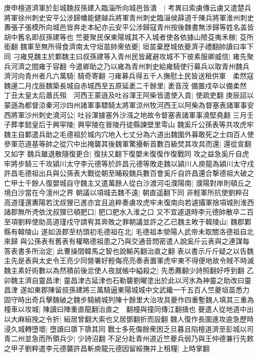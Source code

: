 庚申檀道濟軍於彭城魏叔孫建入臨淄所向城邑皆潰　|{
	考異曰索虜傳云虜又遣楚兵將軍徐州刺史安平公涉歸幡能健越兵將軍青州刺史臨淄侯薛道千陳兵將軍淮州刺史夀張子張模所向城邑皆奔走本紀亦云安平公涉歸寇青州按後魏書無涉歸等姓名盖皆胡中舊名即叔孫建等也}
竺夔聚民保東陽城其不入城者使各依據山險芟夷禾稼|{
	芟所銜翻}
魏軍至無所得食濟南太守垣苗帥衆依夔|{
	垣苗棄歷城依夔濟子禮翻帥讀曰率下同}
刁雍見魏主於鄴魏主曰叔孫建等入青州民皆藏避攻城不下彼素服卿威信|{
	雍先聚兵河濟之間雍于容翻}
今遣卿助之乃以雍為青州刺史給雍騎使行募兵以取青州魏兵濟河向青州者凡六萬騎|{
	騎奇寄翻}
刁雍募兵得五千人撫慰土民皆送租供軍　柔然寇魏邊二月戊辰魏築長城自赤城西至五原延袤二千餘里|{
	袤音茂}
備置戍卒以備柔然　丁丑太皇太后蕭氏殂　河西王蒙遜及吐谷渾王阿柴皆遣使入貢|{
	使疏吏翻}
庚辰詔以蒙遜為都督涼秦河沙四州諸軍事驃騎太將軍涼州牧河西王以阿柴為督塞表諸軍事安西將軍沙州刺史澆河公|{
	吐谷渾據塞外沙漒之地故令督塞表諸軍事澆堅堯翻}
三月壬子葬孝懿皇后于興寜陵|{
	興寜陵在晉陵丹徒縣諫壁里雩山}
魏奚斤公孫表等共攻虎牢魏主自鄴遣兵助之毛德祖於城内穴地入七丈分為六道出魏圍外募敢死之士四百人使參軍范道基等帥之從穴中出掩襲其後魏軍驚擾斬首數百級焚其攻具而還|{
	還從宣翻又如字}
魏兵雖退散隨復更合|{
	復扶又翻下復嬰未復復作復戰同}
攻之益急奚斤自虎牢將步騎三千攻潁川太守李元德等於許昌元德等敗走魏以潁川人庾龍為潁川太守戍許昌毛德祖出兵與公孫表大戰從朝至晡殺魏兵數百會奚斤自許昌還合撃德祖大破之亡甲士千餘人復嬰城自守魏主又遣萬餘人從白沙渡河屯濮陽南|{
	濮陽對岸則頓丘之境白沙當在今澶州之界}
朝議以項城去魏不遠|{
	朝直遥翻下同}
非輕軍所抗使劉粹召高道瑾還夀陽若沈叔狸已進亦宜且追粹奏虜攻虎牢未復南向若遽攝軍捨項城則淮西諸郡無所凴依沈叔狸已頓肥口|{
	肥口肥水入淮之口}
又不宜遽退時李元德帥散卒二百至項劉粹使助高道瑾戍守請宥其奔敗之罪朝議並許之乙已魏主畋于韓陵山|{
	魏郡鄴縣有韓陵山}
遂如汲郡至枋頭初毛德祖在北|{
	毛德祖本滎陽人武帝未取關洛德祖自北來歸}
與公孫表有舊表有權略德祖患之乃與交通音問密遣人說奚斤云表與之連謀每答表書多所治定|{
	此曹操間韓馬之智也說輸芮翻治直之翻}
表以書示斤斤疑之以告魏主先是表與太史令王亮少同營署好輕侮亮亮奏表置軍虎牢東不得便地故令賊不時滅魏主素好術數以為然積前後忿使人夜就帳中縊殺之|{
	先悉薦翻少詩照翻好呼到翻}
乙卯魏主濟自靈昌津|{
	靈昌津古延津也石勒襲劉曜塗出於此以河氷為神靈之助改曰靈昌津}
遂如東郡陳留叔孫建將三萬騎逼東陽城城中文武纔一千五百人竺夔垣苗悉力固守時出奇兵擊魏破之魏步騎繞城列陳十餘里大治攻具夔作四重塹魏人填其三重為橦車以攻城|{
	陳讀曰陣重直龍翻治直之　翻橦與撞同傳江翻擣也}
夔遣人從地道中出以大麻絙挽之令折|{
	絙居曾翻大索也又居鄧翻折而設翻}
魏人復作長圍進攻逾急歷時浸久城轉墮壞|{
	墮讀曰隳下隳其同}
戰士多死傷餘衆困乏旦暮且陷檀道濟至彭城以司青二州並急而所領兵少|{
	少詩沼翻}
不足分赴青州道近竺夔兵弱乃與王仲德兼行先敕之甲子劉粹遣李元德襲許昌斬庾龍元德因留綏撫并上租糧|{
	上時掌翻}
